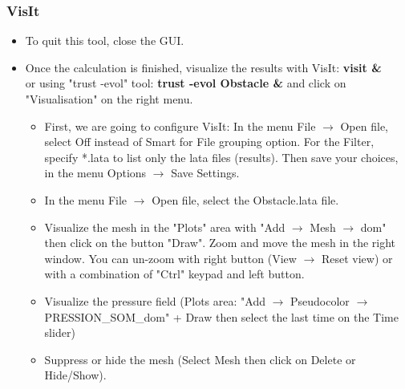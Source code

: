 \documentclass[10pt, hyperref={unicode=true,pdfusetitle, bookmarks=true,bookmarksnumbered=false,bookmarksopen=false, breaklinks=false,pdfborder={0 0l 1},backref=true,colorlinks=true,linkcolor=darkblue,pageanchor}]{beamer}
\begin{document}
\begin{frame}
\begin{block}{}
\end{block}
\end{frame}
\begin{frame}
\frametitle{VisIt}
\begin{block}{}

\begin{itemize}
\item To quit this tool, close the GUI.

\item Once the calculation is finished, visualize the results with VisIt: \textbf{visit \&} \\
or using "trust -evol" tool: \textbf{trust -evol Obstacle \&} and click on "Visualisation" on the right menu.

    \begin{itemize}
    \item [$\circ$] First, we are going to configure VisIt: {\footnotesize{In the menu File $\rightarrow$ Open file, select Off instead of Smart for File grouping option. For the Filter, specify *.lata to list only the lata files (results). Then save your choices, in the menu Options $\rightarrow$ Save Settings.}}

    \item [$\circ$] In the menu File $\rightarrow$ Open file, select the Obstacle.lata file.

    \item [$\circ$] Visualize the mesh in the "Plots" area with "Add $\rightarrow$ Mesh $\rightarrow$ dom" then click on the button "Draw". Zoom and move the mesh in the right window. You can un-zoom with right button (View $\rightarrow$ Reset view) or with a combination of "Ctrl" keypad and left button.

    \item [$\circ$] Visualize the pressure field ({\footnotesize{Plots area: "Add $\rightarrow$ Pseudocolor $\rightarrow$ PRESSION\_SOM\_dom" + Draw then select the last time on the Time slider}})
    \item [$\circ$] Suppress or hide the mesh (Select Mesh then click on Delete or Hide/Show).
    \end{itemize}
\end{itemize}

\end{block}
\end{frame}
\end{document}
